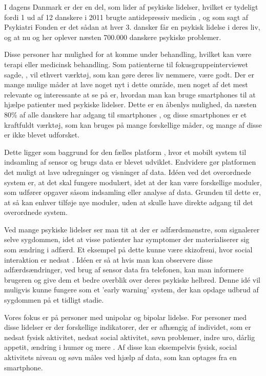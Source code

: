 I dagens Danmark er der en del, som lider af psykiske lidelser, hvilket er tydeligt fordi 1 ud af 12 danskere i 2011 brugte antidepressiv medicin \citep{misc:forbrugAntidepressiva}, og som sagt af Psykiatri Fonden er det sådan at hver 3. dansker får en psykisk lidelse i deres liv, og at nu og her oplever næsten 700.000 danskere psykiske problemer\citep{psykiatrifonden}. 

Disse personer har mulighed for at komme under behandling, hvilket kan være terapi eller medicinsk behandling.
Som patienterne til fokusgruppeinterviewet sagde, \citep[Kapitel 1, Sektion 5]{misc:faellesrapp}, vil ethvert værktøj, som kan gøre deres liv nemmere, være godt.
Der er mange mulige måder at lave noget nyt i dette område, men noget af det mest relevante og interessante at se på er, hvordan man kan bruge smartphones til at hjælpe patienter med psykiske lidelser.
Dette er en åbenlys mulighed, da næsten 80\% af alle danskere har adgang til smartphones \citep{misc:dstElektronik}, og disse smartphones er et kraftfuldt værktøj, som kan bruges på mange forskellige måder, og mange af disse er ikke blevet udforsket.

Dette ligger som baggrund for den fælles platform \citep{misc:faellesrapp}, hvor et mobilt system til indsamling af sensor og brugs data er blevet udviklet. 
Endvidere gør platformen det muligt at lave udregninger og visninger af data.
Idéen ved det overordnede system er, at det skal fungere modulært, idet at der kan være forskellige moduler, som udfører opgaver såsom indsamling eller analyse af data. 
Grunden til dette er, at så kan enhver tilføje nye moduler, uden at skulle have direkte adgang til det overordnede system.

Ved mange psykiske lidelser ser man tit at der er adfærdsmønstre, som signalerer selve sygdommen, idet at visse patienter har symptomer der materialiserer sig som ændring i adfærd.
Et eksempel på dette kunne være skizofreni, hvor social interaktion er nedsat \citep{misc:negativeSymptomsSchizo}.
Idéen er så at hvis man kan observere disse adfærdsændringer, ved brug af sensor data fra telefonen, kan man informere brugeren og give dem et bedre overblik over deres psykiske helbred.
Denne idé vil muligvis kunne fungere som et 'early warning' system, der kan opdage udbrud af sygdommen på et tidligt stadie.

Vores fokus er på personer med unipolar og bipolar lidelse. 
For personer med disse lidelser er der forskellige indikatorer, der er afhængig af individet, som er nedsat fysisk aktivitet, nedsat social aktivitet, søvn problemer, indre uro, dårlig appetit, ændring i humør og mere \citep{misc:faellesrapp}.
Af disse kan eksempelvis fysisk, social aktivitets niveau og søvn måles ved hjælp af data, som kan optages fra en smartphone.

